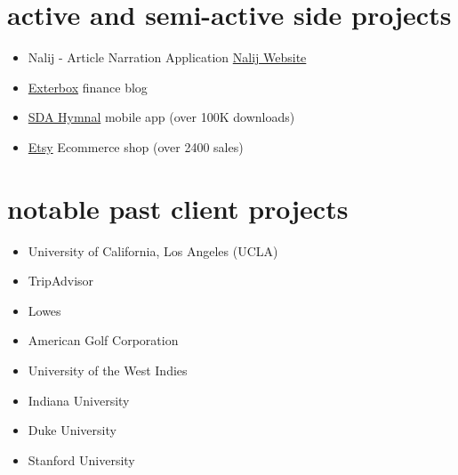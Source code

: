 \documentclass[]{friggeri-cv} %
\begin{document}

\section{active and semi-active side projects}
\begin{itemize}
    \item Nalij - Article Narration Application {\href{https://nalij-api.web.app/}{Nalij Website}}
    \item {\href{https://exterbox.com}{Exterbox} finance blog}
    \item {\href{https://play.google.com/store/apps/details?id=com.ionicframework.sdanewandoldhymnal816673&hl=en&gl=US}{SDA Hymnal} mobile app (over 100K downloads)}
    \item {\href{https://www.etsy.com/shop/BalloonBlowout}{Etsy} Ecommerce shop (over 2400 sales)}
\end{itemize}

\section{notable past client projects}
\begin{multicols}{2}
    \begin{itemize}
        \item University of California, Los Angeles (UCLA)
        \item TripAdvisor
        \item Lowes
        \item American Golf Corporation
    \end{itemize}
    \columnbreak
        \begin{itemize}
            \item University of the West Indies
            \item Indiana University
            \item Duke University
            \item Stanford University
        \end{itemize}
\end{multicols}
\end{document}
